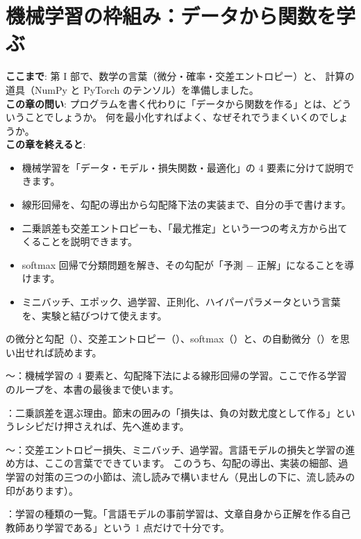 \chapter{機械学習の枠組み：データから関数を学ぶ}\label{ch:ml}


\begin{chapterlead}
\textbf{ここまで}: 第 I 部で、数学の言葉（微分・確率・交差エントロピー）と、
計算の道具（NumPy と PyTorch のテンソル）を準備しました。\\[1mm]
\textbf{この章の問い}: プログラムを書く代わりに「データから関数を作る」とは、どういうことでしょうか。
何を最小化すればよく、なぜそれでうまくいくのでしょうか。\\[1mm]
\textbf{この章を終えると}:
\begin{itemize}
\item 機械学習を「データ・モデル・損失関数・最適化」の 4 要素に分けて説明できます。
\item 線形回帰を、勾配の導出から勾配降下法の実装まで、自分の手で書けます。
\item 二乗誤差も交差エントロピーも、「最尤推定」という一つの考え方から出てくることを説明できます。
\item softmax 回帰で分類問題を解き、その勾配が「予測 $-$ 正解」になることを導けます。
\item ミニバッチ、エポック、過学習、正則化、ハイパーパラメータという言葉を、実験と結びつけて使えます。
\end{itemize}
\end{chapterlead}

\begin{readingguide}
\item[\rgpre] の微分と勾配（）、交差エントロピー（）、softmax（）と、の自動微分（）を思い出せれば読めます。
\item[\rgmust] 〜：機械学習の 4 要素と、勾配降下法による線形回帰の学習。ここで作る学習のループを、本書の最後まで使います。
\item[\rgskim] ：二乗誤差を選ぶ理由。節末の囲みの「損失は、負の対数尤度として作る」というレシピだけ押さえれば、先へ進めます。
\item[\rgmust] 〜：交差エントロピー損失、ミニバッチ、過学習。言語モデルの損失と学習の進め方は、ここの言葉でできています。
このうち、勾配の導出、実装の細部、過学習の対策の三つの小節は、流し読みで構いません（見出しの下に、流し読みの印があります）。
\item[\rgskim] ：学習の種類の一覧。「言語モデルの事前学習は、文章自身から正解を作る自己教師あり学習である」という 1 点だけで十分です。
\end{readingguide}

